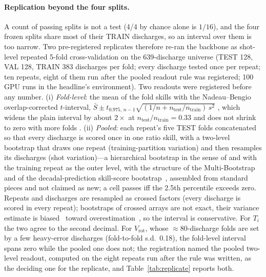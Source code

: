 \documentclass[10pt]{article}
\newcommand{\Ti}{\ensuremath{T_i}}
\newcommand{\Vrot}{\ensuremath{V_\mathrm{rot}}}
\begin{document}
\paragraph{Replication beyond the four splits.}
A count of passing splits is not a test (4/4 by chance alone is $1/16$), and the
four frozen splits share most of their TRAIN discharges, so an interval over them
is too narrow. Two pre-registered replicates therefore re-ran the backbone as
shot-level repeated 5-fold cross-validation on the 639-discharge universe (TEST
128, VAL 128, TRAIN 383 discharges per fold; every discharge tested once per
repeat; ten repeats, eight of them run after the pooled readout rule was
registered; 100 GPU runs in the headline's
environment). Two readouts were registered before any number. (i) \emph{Fold-level}:
the mean of the fold skills with the Nadeau--Bengio overlap-corrected $t$-interval,
$\bar S \pm t_{0.975,\,n-1}\sqrt{(1/n + n_{\mathrm{test}}/n_{\mathrm{train}})\,s^{2}}$
\citep{Nadeau2003Inference}, which widens the plain interval by about $2\times$ at
$n_{\mathrm{test}}/n_{\mathrm{train}} = 0.33$ and does not shrink to zero with more
folds \citep{Bates2024CrossValidation}. (ii) \emph{Pooled}: each repeat's five TEST
folds concatenated so that every discharge is scored once in one ratio skill, with
a two-level bootstrap that draws one repeat (training-partition variation) and
then resamples its discharges (shot variation)---a hierarchical bootstrap in the
sense of \citet{Saravanan2020Hierarchical} and \citet{Ren2010Nonparametric} with
the training repeat as the outer level, with the structure of the
Multi-Bootstrap~\citep{Sellam2022MultiBERTs} and of the decadal-prediction skill-score
bootstrap~\citep{Goddard2013Verification}, assembled from standard pieces and not
claimed as new; a cell passes iff the 2.5th percentile exceeds zero. Repeats and
discharges are resampled as crossed factors (every discharge is scored in every
repeat); bootstraps of crossed arrays are not exact, their variance estimate is
biased~\citep{Gallas2009Framework} toward overestimation~\citep{Owen2007Pigeonhole},
so the interval is conservative. For \Ti{} the two agree to the second decimal. For
\Vrot{}, whose $\approx$80-discharge folds are set by a few heavy-error discharges
(fold-to-fold s.d.\ 0.18), the fold-level interval spans zero while the pooled one
does not; the registration named the pooled two-level readout, computed on the
eight repeats run after the rule was written, as the deciding one for the
replicate, and Table~\ref{tab:replicate} reports both.
\end{document}
